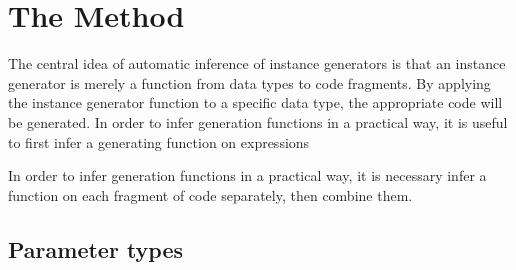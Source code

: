 \documentclass{llncs}
\begin{document}
\begin{comment}
\subsection{The Derive tool}

The Derive tool \cite{derive} is a competitor to DrIFT, designed to alleviate some of the disadvantages. The first advantage is that instance generators can added easily, without modifying the Derive tool. Secondly, by using the Template Haskell \cite{template_haskell} extension, no preprocessing phase is required. In order to integrate with Template Haskell, an instance generator takes a representation of a data type, and generates a Haskell syntax tree.

Writing an instance generator requires knowledge of the representation of both the data type, and the Haskell syntax tree. Unfortunately, the Haskell syntax tree is represented by a large data type, which takes time to learn. After writing an instance generator, the user must check that the generator matches their intention, by testing on a suitable range of data types. Both of these factors increase the time required to write an instance generator.

We have integrated automatic derivation of an instance generator, following the scheme in this paper, into the Derive tool. In order to specify a new instance generator, the user can \textit{either} specify a derivation function, \textit{or} have one automatically generated from an example.
\end{comment}

\section{The Method}
\label{sec:automatic_instances}

The central idea of automatic inference of instance generators is that an instance generator is merely a function from data types to code fragments. By applying the instance generator function to a specific data type, the appropriate code will be generated. In order to infer generation functions in a practical way, it is useful to first infer a generating function on expressions 


In order to infer generation functions in a practical way, it is necessary infer a function on each fragment of code separately, then combine them.

\subsection{Parameter types}
\end{document}
